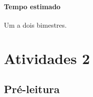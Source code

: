 \documentclass[12pt]{extarticle}
\begin{document}
\paragraph{Tempo estimado} Um a dois bimestres.


\section{Atividades 2}

\subsection{Pré-leitura}

%
%
%
%
%
%
\end{document}
